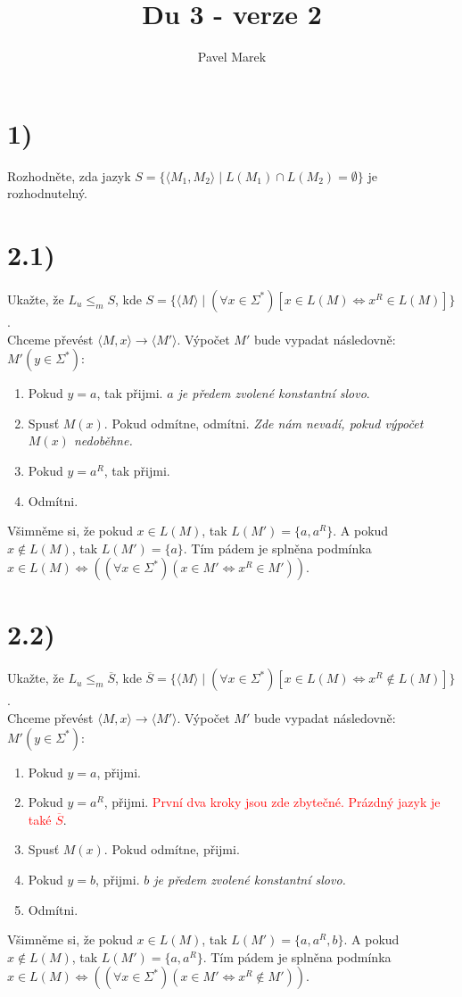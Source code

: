 \documentclass{article}
\begin{document}
\title{Du 3 - verze 2}
\author{Pavel Marek}
\date{}

\maketitle

\section*{1)}
Rozhodněte, zda jazyk $S = \{\langle M_1, M_2 \rangle \mid
L(M_1) \cap L(M_2) = \emptyset\}$ je rozhodnutelný.

\section*{2.1)}
Ukažte, že $L_u \leq_m S$, kde $S=\{\langle M \rangle \mid
(\forall x \in \Sigma^*)
[x \in L(M) \Leftrightarrow x^R \in L(M)]\}$.\\

Chceme převést $\langle M, x \rangle \rightarrow \langle M' \rangle$.
Výpočet $M'$ bude vypadat následovně: \\
$M'(y \in \Sigma^*)$:
\begin{enumerate}
  \item Pokud $y = a$, tak přijmi. \emph{$a$ je předem zvolené konstantní
  slovo}.
  \item Spusť $M(x)$. Pokud odmítne, odmítni. \emph{Zde nám nevadí, pokud
  výpočet $M(x)$ nedoběhne.}
  \item Pokud $y = a^R$, tak přijmi.
  \item Odmítni.
\end{enumerate}

Všimněme si, že pokud $x \in L(M)$, tak $L(M') = \{a, a^R\}$. A pokud
$x \notin L(M)$, tak $L(M') = \{a\}$. Tím pádem je splněna podmínka
$x \in L(M) \Leftrightarrow ((\forall x \in \Sigma^*)
(x \in M' \Leftrightarrow x^R \in M'))$.


\section*{2.2)}
Ukažte, že $L_u \leq_m \overline{S}$, kde $\overline{S} = \{\langle M \rangle
\mid (\forall x \in \Sigma^*) [x \in L(M) \Leftrightarrow x^R \notin L(M)]\}$.\\

Chceme převést $\langle M, x \rangle \rightarrow \langle M' \rangle$. 
Výpočet $M'$ bude vypadat následovně: \\
$M'(y \in \Sigma^*)$:
\begin{enumerate}
  \item Pokud $y = a$, přijmi.
  \item Pokud $y = a^R$, přijmi. \textcolor{red}{První dva kroky jsou zde
  zbytečné. Prázdný jazyk je také $\overline{S}$}.
  \item Spusť $M(x)$. Pokud odmítne, přijmi.
  \item Pokud $y = b$, přijmi. \emph{$b$ je předem zvolené konstantní slovo.}
  \item Odmítni.
\end{enumerate}

Všimněme si, že pokud $x \in L(M)$, tak $L(M') = \{a, a^R, b\}$. A pokud
$x \notin L(M)$, tak $L(M') = \{a, a^R\}$. Tím pádem je splněna podmínka
$x \in L(M) \Leftrightarrow ((\forall x \in \Sigma^*)
(x \in M' \Leftrightarrow x^R \notin M'))$.
\end{document}
